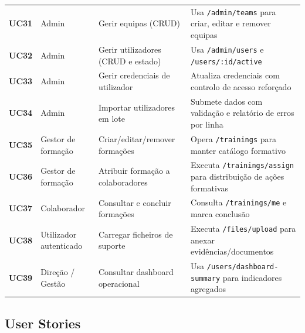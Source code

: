 \documentclass[11pt,a4paper,twoside]{article}
\begin{document}
\begin{longtable}{>{\small\centering\arraybackslash\bfseries}p{0.85cm} >{\small}p{2.6cm} >{\small}p{3.5cm} >{\small}p{6.3cm}}
UC31 & Admin & Gerir equipas (CRUD) & Usa \texttt{/admin/teams} para criar, editar e remover equipas \\
UC32 & Admin & Gerir utilizadores (CRUD e estado) & Usa \texttt{/admin/users} e \texttt{/users/:id/active} \\
UC33 & Admin & Gerir credenciais de utilizador & Atualiza credenciais com controlo de acesso reforçado \\
UC34 & Admin & Importar utilizadores em lote & Submete dados com validação e relatório de erros por linha \\
UC35 & Gestor de formação & Criar/editar/remover formações & Opera \texttt{/trainings} para manter catálogo formativo \\
UC36 & Gestor de formação & Atribuir formação a colaboradores & Executa \texttt{/trainings/assign} para distribuição de ações formativas \\
UC37 & Colaborador & Consultar e concluir formações & Consulta \texttt{/trainings/me} e marca conclusão \\
UC38 & Utilizador autenticado & Carregar ficheiros de suporte & Executa \texttt{/files/upload} para anexar evidências/documentos \\
UC39 & Direção / Gestão & Consultar dashboard operacional & Usa \texttt{/users/dashboard-summary} para indicadores agregados \\
\bottomrule
\end{longtable}

\subsection{User Stories}
\end{document}
